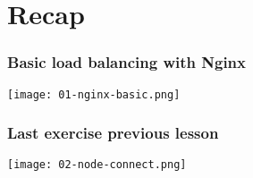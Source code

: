 \section{Recap}

\frame{\tableofcontents[currentsection]}

\begin{frame}
    \frametitle{Basic load balancing with Nginx}
    \begin{center}
        \texttt{[image: 01-nginx-basic.png]}
    \end{center}

\end{frame}

\begin{frame}
    \frametitle{Last exercise previous lesson}
    \begin{center}
        \texttt{[image: 02-node-connect.png]}
    \end{center}

\end{frame}